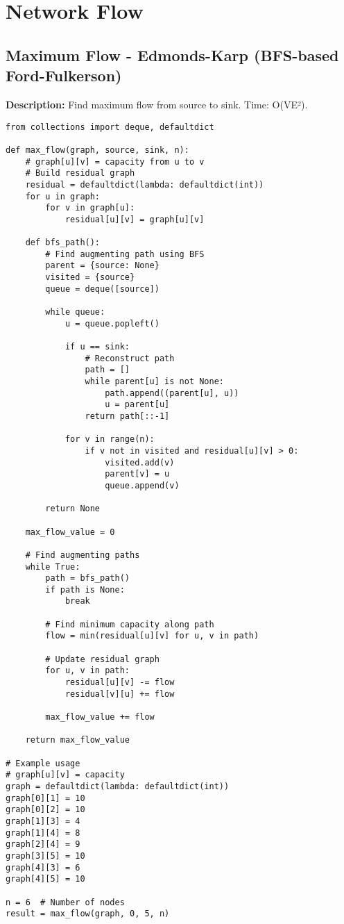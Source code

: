 \section{Network Flow}

\subsection{Maximum Flow - Edmonds-Karp (BFS-based Ford-Fulkerson)}
\textbf{Description:} Find maximum flow from source to sink. Time: O(VE²).

\begin{lstlisting}
from collections import deque, defaultdict

def max_flow(graph, source, sink, n):
    # graph[u][v] = capacity from u to v
    # Build residual graph
    residual = defaultdict(lambda: defaultdict(int))
    for u in graph:
        for v in graph[u]:
            residual[u][v] = graph[u][v]
    
    def bfs_path():
        # Find augmenting path using BFS
        parent = {source: None}
        visited = {source}
        queue = deque([source])
        
        while queue:
            u = queue.popleft()
            
            if u == sink:
                # Reconstruct path
                path = []
                while parent[u] is not None:
                    path.append((parent[u], u))
                    u = parent[u]
                return path[::-1]
            
            for v in range(n):
                if v not in visited and residual[u][v] > 0:
                    visited.add(v)
                    parent[v] = u
                    queue.append(v)
        
        return None
    
    max_flow_value = 0
    
    # Find augmenting paths
    while True:
        path = bfs_path()
        if path is None:
            break
        
        # Find minimum capacity along path
        flow = min(residual[u][v] for u, v in path)
        
        # Update residual graph
        for u, v in path:
            residual[u][v] -= flow
            residual[v][u] += flow
        
        max_flow_value += flow
    
    return max_flow_value

# Example usage
# graph[u][v] = capacity
graph = defaultdict(lambda: defaultdict(int))
graph[0][1] = 10
graph[0][2] = 10
graph[1][3] = 4
graph[1][4] = 8
graph[2][4] = 9
graph[3][5] = 10
graph[4][3] = 6
graph[4][5] = 10

n = 6  # Number of nodes
result = max_flow(graph, 0, 5, n)
\end{lstlisting}

